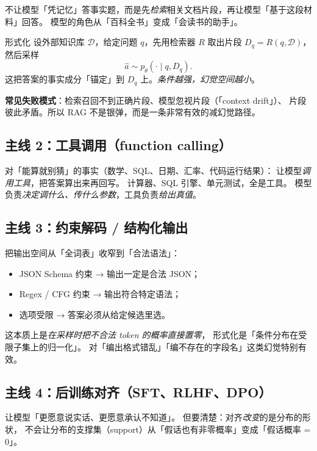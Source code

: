 \documentclass[11pt,a4paper]{ctexart}
\begin{document}
\begin{intuitionblock}
不让模型「凭记忆」答事实题，而是先\emph{检索}相关文档片段，再让模型「基于这段材料」回答。
模型的角色从「百科全书」变成「会读书的助手」。
\end{intuitionblock}

\begin{mathbox}{形式化}
设外部知识库 $\mathcal{D}$，给定问题 $q$，先用检索器 $R$ 取出片段 $D_q = R(q, \mathcal{D})$，
然后采样
\[
  \hat a \sim p_\theta(\cdot \mid q, D_q).
\]
这把答案的事实成分「锚定」到 $D_q$ 上。\emph{条件越强，幻觉空间越小}。
\end{mathbox}

\textbf{常见失败模式}：检索召回不到正确片段、模型忽视片段（「context drift」）、
片段彼此矛盾。所以 RAG 不是银弹，而是一条非常有效的减幻觉路径。

\subsection{主线 2：工具调用（function calling）}

\begin{engbox}
对「能算就别猜」的事实（数学、SQL、日期、汇率、代码运行结果）：
让模型\emph{调用工具}，把答案算出来再回写。
计算器、SQL 引擎、单元测试，全是工具。
模型负责\emph{决定调什么、传什么参数}，工具负责\emph{给出真值}。
\end{engbox}

\subsection{主线 3：约束解码 / 结构化输出}

把输出空间从「全词表」收窄到「合法语法」：
\begin{itemize}
  \item JSON Schema 约束 → 输出一定是合法 JSON；
  \item Regex / CFG 约束 → 输出符合特定语法；
  \item 选项受限 → 答案必须从给定候选里选。
\end{itemize}
这本质上是\emph{在采样时把不合法 token 的概率直接置零}，
形式化是「条件分布在受限子集上的归一化」。
对「编出格式错乱」「编不存在的字段名」这类幻觉特别有效。

\subsection{主线 4：后训练对齐（SFT、RLHF、DPO）}

让模型「更愿意说实话、更愿意承认不知道」。
但要清楚：对齐\emph{改变}的是分布的形状，
不会让分布的支撑集（support）从「假话也有非零概率」变成「假话概率 = 0」。
\end{document}
